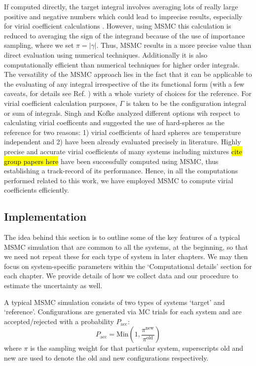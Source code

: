     If computed directly, the target integral involves averaging lots of really large positive and negative numbers which could lead to imprecise results, especially for virial coefficient calculations \cite{Singh2004}. However, using MSMC this calculation is reduced to averaging the sign of the integrand because of the use of importance sampling, where we set $\pi = |\gamma|$. Thus, MSMC results in a more precise value than direct evaluation using numerical techniques. Additionally it is also computationally efficient than numerical techniques for higher order integrals. The versatility of the MSMC approach lies in the fact that it can be applicable to the evaluating of any integral irrespective of the its functional form (with a few caveats, for details see Ref. \cite{Singh2004}) with a whole variety of choices for the reference. For virial coefficient calculation purposes, $\Gamma$ is taken to be the configuration integral or sum of integrals. Singh and Kofke \cite{Singh2004} analyzed different options wih respect to calculating virial coefficents and suggested the use of hard-spheres as the reference for two reasons: 1) virial coefficients of hard spheres are temperature independent and 2) have been already evaluated precisely in literature. Highly precise and accurate virial coefficients of many systems including mixtures \hl{cite group papers here} have been successfully computed using MSMC, thus establishing a track-record of its performance. Hence, in all the computations performed related to this work, we have employed MSMC to compute virial coefficients efficiently.

    \subsection{Implementation}
    \label{subsec:MSMCimplementation}
        The idea behind this section is to outline some of the key features of a typical MSMC simulation that are common to all the systems, at the beginning, so that we need not repeat these for each type of system in later chapters. We may then focus on system-specific parameters within the `Computational details' section for each chapter. We provide details of how we collect data and our procedure to estimate the uncertainty as well.

        A typical MSMC simulation consists of two types of systems `target' and `reference'. Configurations are generated via MC trials for each system and are accepted/rejected with a probability $P_{\text{acc}}$:
        \begin{equation}
            \label{eq:MCacceptance}
            P_{\text{acc}} = \text{Min} \left(1, \displaystyle\frac{\pi^{\text{new}}}{\pi^{\text{old}}} \right)
        \end{equation}
        where $\pi$ is the sampling weight for that particular system, superscripts old and new are used to denote the old and new configurations respectively.

